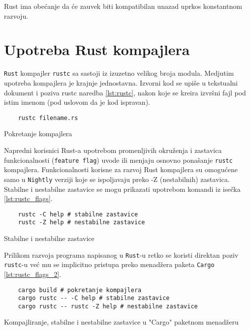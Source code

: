 \documentclass[11pt]{article}
\begin{document}
Rust ima obećanje da će zauvek biti kompatibilan unazad uprkos konstantnom razvoju. 

\newpage

\section{Upotreba Rust kompajlera}

\verb|Rust| kompajler \verb|rustc| sa sastoji iz izuzetno velikog broja modula. 
Medjutim upotreba kompajlera je krajnje jednostavna.
Izvorni kod se upiše u tekstualni dokument i poziva rustc naredba \ref{lst:rustc}, 
nakon koje se kreira izvršni fajl pod istim imenom (pod uslovom da je kod ispravan).
\begin{listing}[H]
\begin{verbatim}
    rustc filename.rs
\end{verbatim}
\caption{Pokretanje kompajlera}
\label{lst:rustc}
\end{listing}
Napredni korisnici Rust-a upotrebom promenljivih okruženja i zastavica funkcionalnosti 
(\verb|feature flag|) uvode ili menjaju osnovno ponašanje \verb|rustc| kompajlera.
Funkcionalnosti korisne za razvoj Rust kompajlera su omogućene samo u \verb|Nightly| verziji koje se
ispoljavaju preko -Z (nestabilnih) zastavica. Stabilne i nestabilne zastavice se mogu prikazati upotrebom
komandi iz isečka \ref{lst:rustc_flags}.

\begin{listing}[H]
\begin{verbatim}
    rustc -C help # stabilne zastavice 
    rustc -Z help # nestabilne zastavice 
\end{verbatim}
\caption{Stabilne i nestabilne zastavice}
\label{lst:rustc_flags}
\end{listing}

Prilikom razvoja programa napisanog u \verb|Rust|-u retko se koristi direktan poziv \verb|rustc|-u već mu 
se implicitno pristupa preko menadžera paketa \verb|Cargo| \ref{lst:rustc_flags_2}. 

\begin{listing}[H]
\begin{verbatim}
    cargo build # pokretanje kompajlera
    cargo rustc -- -C help # stabilne zastavice 
    cargo rustc -- rustc -Z help # nestabilne zastavice 
\end{verbatim}
\caption{Kompajliranje, stabilne i nestabilne zastavice u "Cargo" paketnom menadžeru}
\label{lst:rustc_flags_2}
\end{listing}
\end{document}
